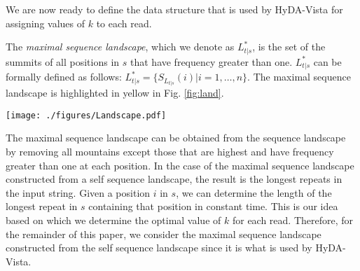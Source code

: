 \noindent We are now ready to define the data structure that is used by HyDA-Vista for assigning values of $k$ to each read.  

\begin{definition} The \emph{maximal sequence landscape}, which we denote as $L^*_{t|s}$, is the set of the summits of all positions in $s$ that have frequency greater than one.  $L^*_{t|s}$ can be formally defined as follows: $L^*_{t|s} = \{ S_{L_{t|s}}(i) | i=1,\ldots, n\}$. The maximal sequence landscape is highlighted in yellow in Fig. \ref{fig:land}. \end{definition}

\vspace{-5mm}
\begin{SCfigure}
\label{fig:land}
\texttt{[image: ./figures/Landscape.pdf]}
\caption{(left) The self sequence landscape for CATCATTTG, and (right) the sequence landscape of GGCATCATTGGGTATAACC with respect to CATCATTTG. The maximal sequence landscape is highlighted in yellow, and the red arrows demonstrate the ascent and descent of the landscapes.}
\end{SCfigure}
\vspace{-5mm}

The maximal sequence landscape can be obtained from the sequence landscape by removing all mountains except those that are highest and have frequency greater than one at each position.  In the case of the maximal sequence landscape constructed from a self sequence landscape, the result is the longest repeats in the input string.  Given a position $i$ in $s$, we can determine the length of the longest repeat in $s$ containing that position in constant time.  This is our idea based on which we determine the optimal value of $k$ for each read.  Therefore, for the remainder of this paper, we consider the maximal sequence landscape constructed from the self sequence landscape since it is what is used by HyDA-Vista.




